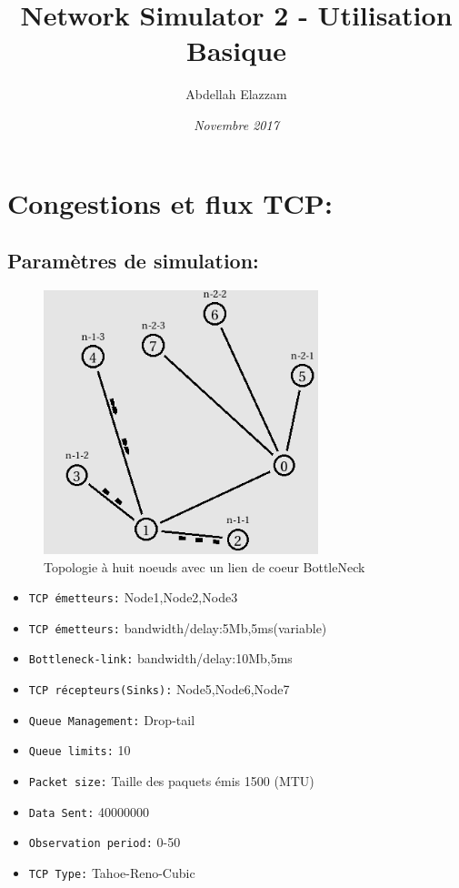 \documentclass[a4paper,12pt]{article}
\title{\textbf{Network Simulator 2 - Utilisation Basique}}
\author{Abdellah Elazzam}
\date{\small{\textit{Novembre 2017}}}
\begin{document}
\maketitle
\thispagestyle{empty}

\section{Congestions et flux TCP:}
\subsection{Paramètres de simulation:}
\begin{figure}[H]
\centering
\includegraphics[width=8cm]{img/topologie.png}
\caption{Topologie à huit noeuds avec un lien de coeur BottleNeck}
\end{figure}
\medbreak
\begin{itemize}
\item \texttt{TCP émetteurs:} Node1,Node2,Node3 
\item \texttt{TCP émetteurs:} bandwidth/delay:5Mb,5ms(variable)
\item \texttt{Bottleneck-link:} bandwidth/delay:10Mb,5ms
\item \texttt{TCP récepteurs(Sinks):} Node5,Node6,Node7 
\item \texttt{Queue Management:} Drop-tail
\item \texttt{Queue limits:} 10
\item \texttt{Packet size:} Taille des paquets émis 1500 (MTU)
\item \texttt{Data Sent:} 40000000
\item \texttt{Observation period:} 0-50
\item \texttt{TCP Type:} Tahoe-Reno-Cubic

\end{itemize}
\end{document}
